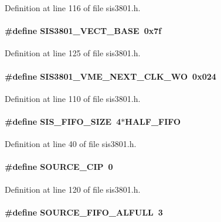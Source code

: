 Definition at line 116 of file sis3801.h.
\paragraph[{SIS3801\_\-VECT\_\-BASE}]{\setlength{\rightskip}{0pt plus 5cm}\#define SIS3801\_\-VECT\_\-BASE~0x7f}\hfill\label{sis3801_8h_ac198ad76e073422d1e29a6a119b12ee8}


Definition at line 125 of file sis3801.h.
\paragraph[{SIS3801\_\-VME\_\-NEXT\_\-CLK\_\-WO}]{\setlength{\rightskip}{0pt plus 5cm}\#define SIS3801\_\-VME\_\-NEXT\_\-CLK\_\-WO~0x024}\hfill\label{sis3801_8h_a9fac4aee66c6b570fb25441c158e8fe7}


Definition at line 110 of file sis3801.h.
\paragraph[{SIS\_\-FIFO\_\-SIZE}]{\setlength{\rightskip}{0pt plus 5cm}\#define SIS\_\-FIFO\_\-SIZE~4$\ast$HALF\_\-FIFO}\hfill\label{sis3801_8h_aa4e05adc523a046116083af8e3825f5d}


Definition at line 40 of file sis3801.h.
\paragraph[{SOURCE\_\-CIP}]{\setlength{\rightskip}{0pt plus 5cm}\#define SOURCE\_\-CIP~0}\hfill\label{sis3801_8h_ad99fe0fe6a19f9e604fda19863343692}


Definition at line 120 of file sis3801.h.
\paragraph[{SOURCE\_\-FIFO\_\-ALFULL}]{\setlength{\rightskip}{0pt plus 5cm}\#define SOURCE\_\-FIFO\_\-ALFULL~3}\hfill\label{sis3801_8h_a1c4f9aa514c4e359578a0a3c471e0e44}


